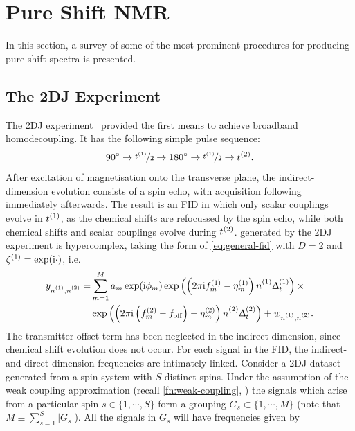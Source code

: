 \section{Pure Shift \acs{NMR}}
In this section, a survey of some of the most prominent procedures for
producing pure shift spectra is presented.
\subsection{The \acs{2DJ} Experiment}
The \ac{2DJ} experiment~\cite{Aue1976, Morris2009} provided the first means to
achieve broadband homodecoupling. It has the following simple pulse sequence:
\[
    \ang{90} \rightarrow \nicefrac{t^{(1)}}{2} \rightarrow \ang{180} \rightarrow \nicefrac{t^{(1)}}{2} \rightarrow t^{(2)}.
\]
After excitation of magnetisation onto the transverse plane, the
indirect-dimension evolution consists of a spin echo, with acquisition
following
immediately afterwards. The result is an \ac{FID} in which only scalar
couplings evolve in $t^{(1)}$, as the chemical shifts are refocussed by the
spin echo, while both chemical shifts and scalar
couplings evolve during $t^{(2)}$.  generated by the \ac{2DJ}
experiment is hypercomplex, taking the form of \cref{eq:general-fid} with
$D=2$ and $\zeta^{(1)} = \exp(\mathrm{i}\cdot)$, i.e.
\begin{equation}%
    \begin{split}%
        y_{\none,\ntwo} =
        &\sum_{m=1}^{M} a_m \exp(\iu \phi_m)
            \exp\left(\left(2 \pi \iu \fonem - \etaonem\right) \none \Dtone\right) \times \\
        &\exp\left(\left(2 \pi \iu  \left(\ftwom - \foff\right)
            - \etatwom\right) \ntwo \Dttwo\right)
            + w_{\none,\ntwo}.
    \end{split}%
    \label{eq:jres-fid}%
\end{equation}%
The transmitter offset term has been neglected in the indirect dimension, since
chemical shift evolution does not occur.
For each signal in the \ac{FID}, the indirect- and direct-dimension
frequencies are intimately linked. Consider a \ac{2DJ} dataset generated from a
spin system with $S$ distinct spins.
Under the assumption of the
weak coupling approximation (recall \cref{fn:weak-coupling},
    )
the signals which arise
from a particular spin $s \in \lbrace 1, \cdots, S \rbrace$ form a grouping $G_s
\subset \lbrace 1, \cdots, M \rbrace$ (note that $M \equiv \sum_{s=1}^S \lvert
G_s \rvert$).
All the signals in $G_s$ will have frequencies given by
